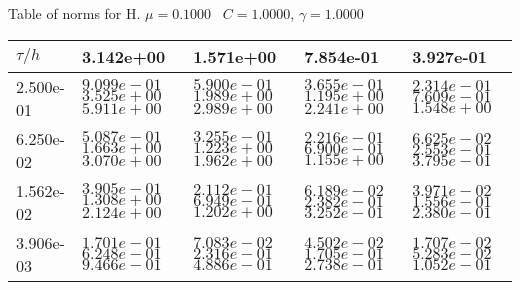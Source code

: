 \begin{center}
Table of norms for H. $\mu = 0.1000$ \, $C = 1.0000$, $\gamma = 1.0000$
  
\begin{tabular}{|p{1in}|p{1in}|p{1in}|p{1in}|p{1in}|} \hline
$\tau / h$ &3.142e+00 &1.571e+00 &7.854e-01 &3.927e-01 \\ \hline 
2.500e-01 & $9.099e-01$  $3.525e+00$  $5.911e+00$  & $5.900e-01$  $1.989e+00$  $2.989e+00$  & $3.655e-01$  $1.195e+00$  $2.241e+00$  & $2.314e-01$  $7.609e-01$  $1.548e+00$  \\ \hline 
6.250e-02 & $5.087e-01$  $1.663e+00$  $3.070e+00$  & $3.255e-01$  $1.223e+00$  $1.962e+00$  & $2.216e-01$  $6.900e-01$  $1.155e+00$  & $6.625e-02$  $2.553e-01$  $3.795e-01$  \\ \hline 
1.562e-02 & $3.905e-01$  $1.308e+00$  $2.124e+00$  & $2.112e-01$  $6.949e-01$  $1.202e+00$  & $6.189e-02$  $2.382e-01$  $3.252e-01$  & $3.971e-02$  $1.556e-01$  $2.380e-01$  \\ \hline 
3.906e-03 & $1.701e-01$  $6.248e-01$  $9.466e-01$  & $7.083e-02$  $2.316e-01$  $4.886e-01$  & $4.502e-02$  $1.705e-01$  $2.738e-01$  & $1.707e-02$  $5.283e-02$  $1.052e-01$  \\ \hline 

\end{tabular}\\[20pt]
\end{center}
